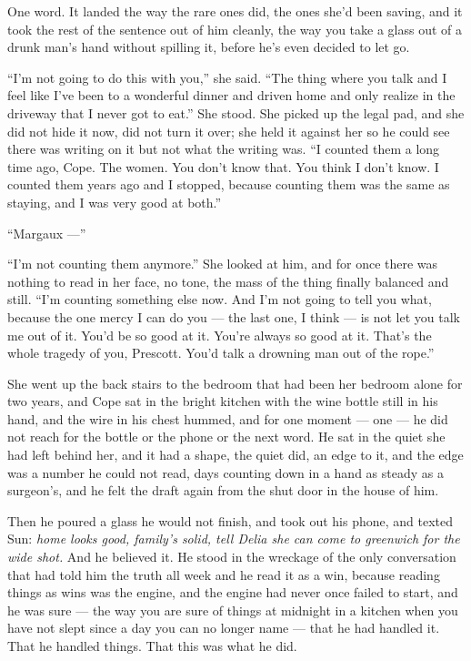 \documentclass[11pt,openany]{book}
\begin{document}
One word. It landed the way the rare ones did, the ones she'd been saving, and it took the rest of the sentence out of him cleanly, the way you take a glass out of a drunk man's hand without spilling it, before he's even decided to let go.

``I'm not going to do this with you,'' she said. ``The thing where you talk and I feel like I've been to a wonderful dinner and driven home and only realize in the driveway that I never got to eat.'' She stood. She picked up the legal pad, and she did not hide it now, did not turn it over; she held it against her so he could see there was writing on it but not what the writing was. ``I counted them a long time ago, Cope. The women. You don't know that. You think I don't know. I counted them years ago and I stopped, because counting them was the same as staying, and I was very good at both.''

``Margaux ---''

``I'm not counting them anymore.'' She looked at him, and for once there was nothing to read in her face, no tone, the mass of the thing finally balanced and still. ``I'm counting something else now. And I'm not going to tell you what, because the one mercy I can do you --- the last one, I think --- is not let you talk me out of it. You'd be so good at it. You're always so good at it. That's the whole tragedy of you, Prescott. You'd talk a drowning man out of the rope.''

She went up the back stairs to the bedroom that had been her bedroom alone for two years, and Cope sat in the bright kitchen with the wine bottle still in his hand, and the wire in his chest hummed, and for one moment --- one --- he did not reach for the bottle or the phone or the next word. He sat in the quiet she had left behind her, and it had a shape, the quiet did, an edge to it, and the edge was a number he could not read, days counting down in a hand as steady as a surgeon's, and he felt the draft again from the shut door in the house of him.

Then he poured a glass he would not finish, and took out his phone, and texted Sun: \textit{home looks good, family's solid, tell Delia she can come to greenwich for the wide shot.} And he believed it. He stood in the wreckage of the only conversation that had told him the truth all week and he read it as a win, because reading things as wins was the engine, and the engine had never once failed to start, and he was sure --- the way you are sure of things at midnight in a kitchen when you have not slept since a day you can no longer name --- that he had handled it. That he handled things. That this was what he did.
\end{document}
